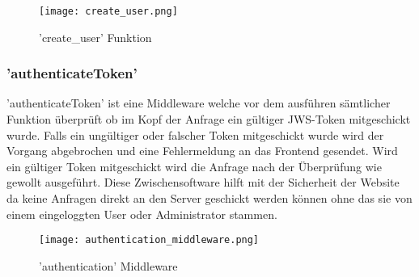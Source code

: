		 		\begin{figure}[H]
		 			\centering
		 			\texttt{[image: create\_user.png]}
		 			\caption{'create\_user' Funktion}
		 		\end{figure}
		 		
		 	\subsubsection{'authenticateToken'}
		 		'authenticateToken' ist eine Middleware welche vor dem ausführen sämtlicher Funktion überprüft ob im Kopf der Anfrage ein gültiger JWS-Token mitgeschickt wurde. Falls ein ungültiger oder falscher Token mitgeschickt wurde wird der Vorgang abgebrochen und eine Fehlermeldung an das Frontend gesendet. Wird ein gültiger Token mitgeschickt wird die Anfrage nach der Überprüfung wie gewollt ausgeführt. Diese Zwischensoftware hilft mit der Sicherheit der Website da keine Anfragen direkt an den Server geschickt werden können ohne das sie von einem eingeloggten User oder Administrator stammen. 
		 		
		 		\begin{figure}[H]
		 			\centering
		 			\texttt{[image: authentication\_middleware.png]}
		 			\caption{'authentication' Middleware}
		 		\end{figure}